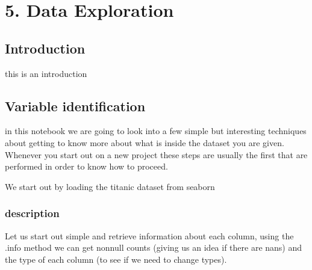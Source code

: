 \documentclass[letterpaper,10pt,english]{jupyterBook}
\begin{document}
\begin{sphinxVerbatim}[commandchars=\\\{\}]
\end{sphinxVerbatim}

\noindent{}


\part{5. Data Exploration}


\chapter{Introduction}
\label{\detokenize{c5_data_exploration/introduction:introduction}}\label{\detokenize{c5_data_exploration/introduction::doc}}
\sphinxAtStartPar
this is an introduction


\chapter{Variable identification}
\label{\detokenize{c5_data_exploration/variable_identification:variable-identification}}\label{\detokenize{c5_data_exploration/variable_identification::doc}}
\sphinxAtStartPar
in this notebook we are going to look into a few simple but interesting techniques about getting to know more about what is inside the dataset you are given. Whenever you start out on a new project these steps are usually the first that are performed in order to know how to proceed.

\sphinxAtStartPar
We start out by loading the titanic dataset from seaborn

\begin{sphinxVerbatim}[commandchars=\\\{\}]
   
  
\end{sphinxVerbatim}


\section{description}
\label{\detokenize{c5_data_exploration/variable_identification:description}}
\sphinxAtStartPar
Let us start out simple and retrieve information about each column, using the .info method we can get non\sphinxhyphen{}null counts (giving us an idea if there are nans) and the type of each column (to see if we need to change types).
\end{document}
